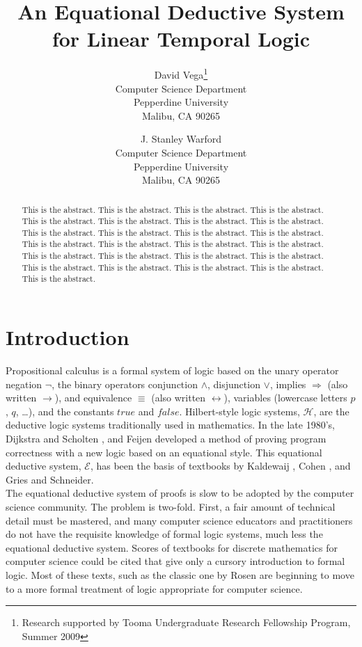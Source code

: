 \documentclass[fleqn, leqno]{article}
\title{An Equational Deductive System\\for Linear Temporal Logic}
\author{David Vega\thanks{Research supported by Tooma Undergraduate Research Fellowship Program, Summer 2009}\\
   Computer Science Department\\
   Pepperdine University\\
   Malibu, CA 90265
   \and
   J. Stanley Warford\\
   Computer Science Department\\
   Pepperdine University\\
   Malibu, CA 90265}
\date{} %
\newcommand{\impl}{\ensuremath{\Rightarrow}}        %
\begin{document}
\maketitle
\begin{abstract}
This is the abstract. This is the abstract. This is the abstract. This is the abstract. This is the abstract.
This is the abstract. This is the abstract. This is the abstract. This is the abstract. This is the abstract. 
This is the abstract. This is the abstract. This is the abstract. This is the abstract. This is the abstract. 
This is the abstract. This is the abstract. This is the abstract. This is the abstract. This is the abstract. 
This is the abstract. This is the abstract. This is the abstract. This is the abstract. This is the abstract. 
\end{abstract}

\thispagestyle{plain}

\section{Introduction}

Propositional calculus is a formal system of logic based on the unary operator negation $\lnot$,
the binary operators conjunction $\land$, disjunction $\lor$, implies $\impl$ (also written $\rightarrow$),
and equivalence $\equiv$ (also written $\leftrightarrow$),
variables (lowercase letters $p$, $q$, \dots), and the constants $true$ and $false$.
Hilbert-style logic systems, $\mathcal{H}$, are the deductive logic systems traditionally used in mathematics.
In the late 1980's, Dijkstra and Scholten \cite{DandS}, and Feijen \cite{Feij} developed a method of proving
program correctness with a new logic based on an equational style.
This equational deductive system, $\mathcal{E}$, has been the basis of textbooks by Kaldewaij \cite{Kald},
Cohen \cite{Cohen}, and Gries and Schneider\cite{LADM}.\\

The equational deductive system of proofs is slow to be adopted by the computer science community.
The problem is two-fold.
First, a fair amount of technical detail must be mastered,
and many computer science educators and practitioners do not have the requisite
knowledge of formal logic systems, much less the equational deductive system.
Scores of textbooks for discrete mathematics for computer science could be cited that give only a cursory introduction to
formal logic. Most of these texts, such as the classic one by Rosen \cite{Rosen} are beginning to move to a more
formal treatment of logic appropriate for computer science.\\
\end{document}
